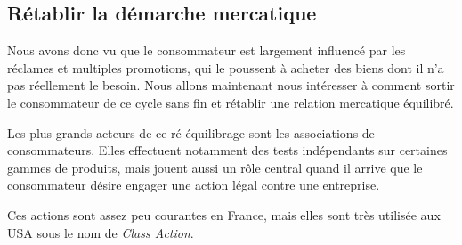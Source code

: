 \subsection{Rétablir la démarche mercatique}
\medbreak
Nous avons donc vu que le consommateur est largement influencé par les réclames et multiples promotions, qui le poussent à acheter des biens dont il n'a pas réellement le besoin. Nous allons maintenant nous intéresser à comment sortir le consommateur de ce cycle sans fin et rétablir une relation mercatique équilibré.

\smallbreak
Les plus grands acteurs de ce ré-équilibrage sont les associations de consommateurs. %
Elles effectuent notamment des tests indépendants sur certaines gammes de produits, mais jouent aussi un rôle central quand il arrive que le consommateur désire engager une action légal contre une entreprise.

Ces actions sont assez peu courantes en France, mais elles sont très utilisée aux USA sous le nom de \textit{Class Action}.
